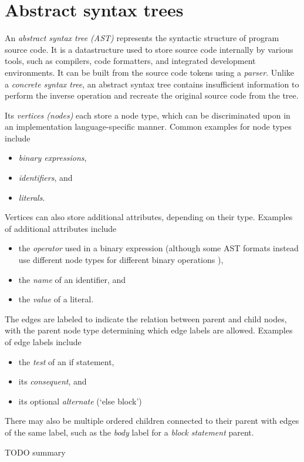 \chapter{Abstract syntax trees}\label{chap:Ast}
An \textit{abstract syntax tree (AST)} represents
the syntactic structure of program source code.
It is a datastructure used to
store source code internally by various tools,
such as compilers, code formatters, and
integrated development environments.
It can be built from the source code tokens using a \textit{parser}.
Unlike a \textit{concrete syntax tree},
an abstract syntax tree contains insufficient information
to perform the inverse operation and
recreate the original source code from the tree.
\autocite{AstImplIdioms}

Its \textit{vertices (nodes)} each store a node type,
which can be discriminated upon
in an implementation language-specific manner.
Common examples for node types include
\begin{itemize}
  \item \textit{binary expressions},
  \item \textit{identifiers}, and
  \item \textit{literals}.
\end{itemize}
Vertices can also store additional attributes,
depending on their type.
Examples of additional attributes include
\begin{itemize}
  \item the \textit{operator} used in a binary expression
  (although some AST formats instead use different node types
  for different binary operations \autocite{AstImplIdioms}),
  \item the \textit{name} of an identifier, and
  \item the \textit{value} of a literal.
\end{itemize}

The edges are labeled to indicate
the relation between parent and child nodes,
with the parent node type determining
which edge labels are allowed.
Examples of edge labels include
\begin{itemize}
  \item the \textit{test} of an if statement,
  \item its \textit{consequent}, and
  \item its optional \textit{alternate} (`else block')
\end{itemize}
There may also be multiple ordered children
connected to their parent with edges of the same label,
such as the \textit{body} label
for a \textit{block statement} parent.





TODO summary
